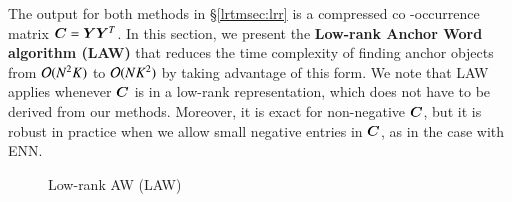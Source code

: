 The output for both methods in \S \ref{lrtmsec:lrr} is a compressed co
\hyp{}occurrence matrix $\bm{C} \mathrel{=} \bm{Y}\bm{Y}^T$. In this section, we present the 
\textbf{Low-rank Anchor Word algorithm (LAW)} that reduces the time complexity
of finding anchor objects from $\mathcal{O}(N^2K)$ to $\mathcal{O}(NK^2)$ by taking
advantage of this form. We note that LAW applies whenever $\bm{C}$ is in a low-rank
representation, which does not have to be derived from our methods. Moreover, it
is exact for non-negative $\bm{C}$, but it is robust in practice when we allow
small negative entries in $\bm{C}$, as in the case with ENN.

\begin{figure}[htbp]
	\begin{algorithm}[H]
		\DontPrintSemicolon
		\caption{Low-rank AW (LAW)}
	  \label{alg:law}      
	\end{algorithm}
	\vspace{2cm}
	\begin{algorithm}[H]
		\DontPrintSemicolon

\end{algorithm}
\end{figure}

